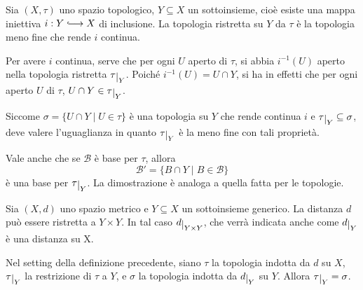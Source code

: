 \begin{defn}
    Sia $(X, \tau)$ uno spazio topologico, $Y \subseteq X$ un sottoinsieme,
    cio\`e esiste una mappa iniettiva $i: Y \hooklongrightarrow X$ di
    inclusione. La topologia ristretta su $Y$ da $\tau$ \`e la topologia meno
    fine che rende $i$ continua.
\end{defn}

\begin{oss}
    Per avere $i$ continua, serve che per ogni $U$ aperto di $\tau$, si abbia
    $i^{-1}(U)$ aperto nella topologia ristretta $\tau \restrict{Y}$. Poiché
    $i^{-1}(U) = U \cap Y$, si ha in effetti che per ogni aperto $U$ di $\tau$,
    $U \cap Y \in \tau \restrict{Y}$.

    Siccome $\sigma = \{U \cap Y \;|\; U \in \tau\}$ \`e una topologia su $Y$
    che rende continua $i$ e ${\tau\restrict{Y} \subseteq \sigma}$, deve valere
    l'uguaglianza in quanto $\tau\restrict{Y}$ \`e la meno fine con tali
    proprietà.
\end{oss}

\begin{oss}
    Vale anche che se $\mathcal{B}$ \`e base per $\tau$, allora
    \[
    \mathcal{B'} = \{B \cap Y \;|\; B \in \mathcal{B}\}
    \]
    \`e una base per $\tau\restrict{Y}$. La dimostrazione \`e analoga a quella
    fatta per le topologie.
\end{oss}

\begin{defn}
    Sia $(X, d)$ uno spazio metrico e $Y \subseteq X$ un sottoinsieme generico.
    La distanza $d$ pu\`o essere ristretta a $Y \times Y$. In tal caso
    $d\restrict{Y \times Y}$, che verr\`a indicata anche come $d\restrict{Y}$
    \`e una distanza su X.
\end{defn}

\begin{prop}
    Nel setting della definizione precedente, siano $\tau$ la topologia indotta
    da $d$ su $X$, $\tau\restrict{Y}$ la restrizione di $\tau$ a $Y$, e $\sigma$
    la topologia indotta da $d\restrict{Y}$ su $Y$. Allora $\tau\restrict{Y} =
    \sigma$.
\end{prop}

